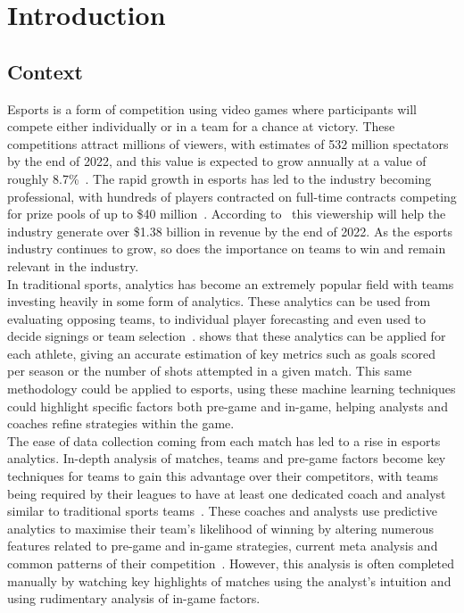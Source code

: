 \chapter{Introduction}\label{ch:introduction}
\section{Context}\label{sec:Context}
Esports is a form of competition using video games where participants will compete either individually or in a team for a chance at victory.
These competitions attract millions of viewers, with estimates of 532 million spectators by the end of 2022, and this value is expected to grow annually at a value of roughly 8.7\%~\citep{newzoo2022viewers}.
The rapid growth in esports has led to the industry becoming professional, with hundreds of players contracted on full-time contracts competing for prize pools of up to \$40 million~\citep{esportsearnings}.
According to~\citet{newzoo2022viewers} this viewership will help the industry generate over \$1.38 billion in revenue by the end of 2022.
As the esports industry continues to grow, so does the importance on teams to win and remain relevant in the industry.\\

In traditional sports, analytics has become an extremely popular field with teams investing heavily in some form of analytics.
These analytics can be used from evaluating opposing teams, to individual player forecasting and even used to decide signings or team selection~\citep{sarlis2020sports, apostolou2019sports}.
\citet{apostolou2019sports, sarlis2020sports} shows that these analytics can be applied for each athlete, giving an accurate estimation of key metrics such as goals scored per season or the number of shots attempted in a given match.
This same methodology could be applied to esports, using these machine learning techniques could highlight specific factors both pre-game and in-game, helping analysts and coaches refine strategies within the game.\\

The ease of data collection coming from each match has led to a rise in esports analytics.
In-depth analysis of matches, teams and pre-game factors become key techniques for teams to gain this advantage over their competitors, with teams being required by their leagues to have at least one dedicated coach and analyst similar to traditional sports teams~\citep{LCSRules}.
These coaches and analysts use predictive analytics to maximise their team's likelihood of winning by altering numerous features related to pre-game and in-game strategies, current \gls{meta} analysis and common patterns of their competition~\citep{kokkinakis2021metagaming}.
However, this analysis is often completed manually by watching key highlights of matches using the analyst's intuition and using rudimentary analysis of in-game factors.\\

